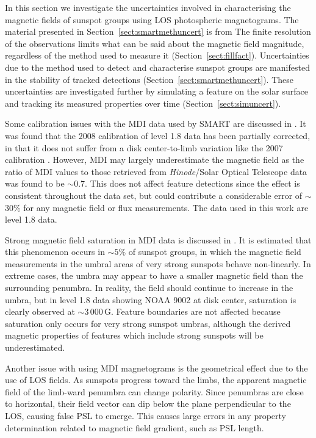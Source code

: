 In this section we investigate the uncertainties involved in characterising the magnetic fields of sunspot groups using \gls{LOS} photospheric magnetograms. The material presented in Section~\ref{sect:smartmethuncert} is from \cite{higgins:2011} The finite resolution of the observations limits what can be said about the magnetic field magnitude, regardless of the method used to measure it (Section~\ref{sect:fillfact}). Uncertainties due to the method used to detect and characterise sunspot groups are manifested in the stability of tracked detections (Section~\ref{sect:smartmethuncert}). These uncertainties are investigated further by simulating a feature on the solar surface and tracking its measured properties over time (Section~\ref{sect:simuncert}).

Some calibration issues with the \gls{MDI} data used by \gls{SMART} are discussed in \citet{Wang:2009}. It was found that the 2008 calibration of level 1.8 data has been partially corrected, in that it does not suffer from a disk center-to-limb variation like the 2007 calibration \citep{Tran:2005}. However, \gls{MDI} may largely underestimate the magnetic field as the ratio of \gls{MDI} values to those retrieved from \emph{Hinode}/Solar Optical Telescope data was found to be $\sim$$0.7$. This does not affect feature detections since the effect is consistent throughout the data set, but could contribute a considerable error of $\sim$$30\%$ for any magnetic field or flux measurements. The data used in this work are level 1.8 data.

Strong magnetic field saturation in \gls{MDI} data is discussed in \citet{Liu:2007}. It is estimated that this phenomenon occurs in $\sim$$5\%$ of sunspot groups, in which the magnetic field measurements in the umbral areas of very strong sunspots behave non-linearly. In extreme cases, the umbra may appear to have a smaller magnetic field than the surrounding \gls{penumbra}. In reality, the field should continue to increase in the \gls{umbra}, but in level 1.8 data showing \gls{NOAA} 9002 at disk center, saturation is clearly observed at $\sim$$3\,000$\,G. Feature boundaries are not affected because saturation only occurs for very strong sunspot \glspl{umbra}, although the derived magnetic properties of features which include strong sunspots will be underestimated. 

Another issue with using \gls{MDI} magnetograms is the geometrical effect due to the use of \gls{LOS} fields. As sunspots progress toward the limbs, the apparent magnetic field of the limb-ward penumbra can change polarity. Since \glspl{penumbra} are close to horizontal, their field vector can dip below the plane perpendicular to the \gls{LOS}, causing false \gls{PSL} to emerge. This causes large errors in any property determination related to magnetic field gradient, such as \gls{PSL} length.

